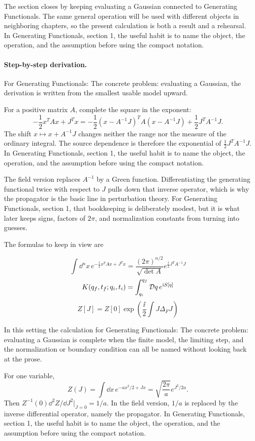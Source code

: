 The section closes by keeping evaluating a Gaussian connected to Generating Functionals.  The same general operation will be used with different objects in neighboring chapters, so the present calculation is both a result and a rehearsal.  In Generating Functionals, section 1, the useful habit is to name the object, the operation, and the assumption before using the compact notation.



\paragraph{Step-by-step derivation.}

For Generating Functionals: The concrete problem: evaluating a Gaussian, the derivation is written from the smallest usable model upward.

For a positive matrix \(A\), complete the square in the exponent:
\[
  -\frac12x^TAx+J^Tx
  =
  -\frac12(x-A^{-1}J)^TA(x-A^{-1}J)
  +\frac12J^TA^{-1}J.
\]
The shift \(x\mapsto x+A^{-1}J\) changes neither the range nor the measure of the ordinary integral.  The source dependence is therefore the exponential of \(\frac12J^TA^{-1}J\).  In Generating Functionals, section 1, the useful habit is to name the object, the operation, and the assumption before using the compact notation.

The field version replaces \(A^{-1}\) by a Green function.  Differentiating the generating functional twice with respect to \(J\) pulls down that inverse operator, which is why the propagator is the basic line in perturbation theory.  For Generating Functionals, section 1, that bookkeeping is deliberately modest, but it is what later keeps signs, factors of \(2\pi\), and normalization constants from turning into guesses.

The formulas to keep in view are

\[
  \int\dd^n x\,e^{-\frac12x^TAx+J^Tx}=\frac{(2\pi)^{n/2}}{\sqrt{\det A}}e^{\frac12J^TA^{-1}J}
\]
\[
  K(q_f,t_f;q_i,t_i)=\int_{q_i}^{q_f}\mathcal D q\,e^{\mathrm i S[q]}
\]
\[
  Z[J]=Z[0]\exp\left(\frac{\ii}{2}\int J\Delta_FJ\right)
\]

In this setting the calculation for Generating Functionals: The concrete problem: evaluating a Gaussian is complete when the finite model, the limiting step, and the normalization or boundary condition can all be named without looking back at the prose.




\begin{example}
For one variable,
\[
  Z(J)=\int\dd x\,e^{-ax^2/2+Jx}
  =\sqrt{\frac{2\pi}{a}}e^{J^2/2a}.
\]
Then \(Z^{-1}(0)\dd^2Z/\dd J^2|_{J=0}=1/a\).  In the field version, \(1/a\) is replaced by the inverse differential operator, namely the propagator.  In Generating Functionals, section 1, the useful habit is to name the object, the operation, and the assumption before using the compact notation.
\end{example}



